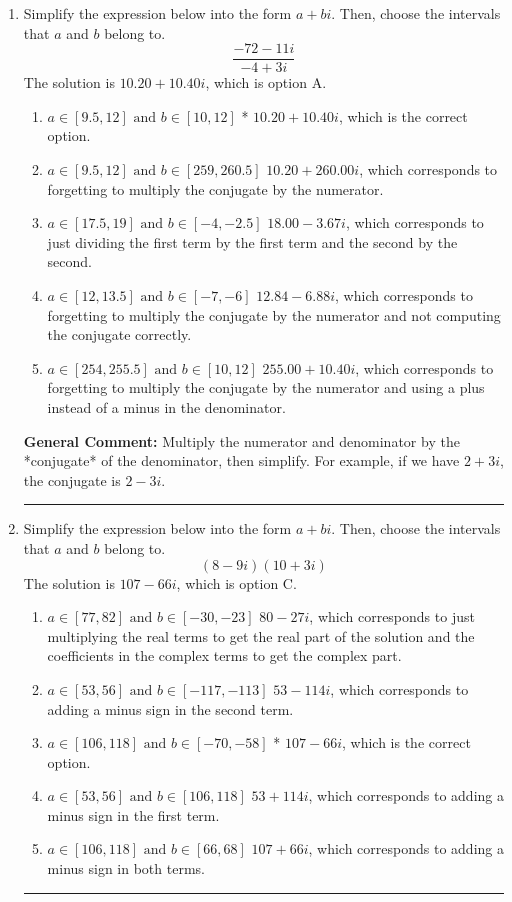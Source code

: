 \documentclass{extbook}[14pt]
\newcommand{\litem}[1]{\item #1

\rule{\textwidth}{0.4pt}}
\begin{document}
\begin{enumerate}\litem{
Simplify the expression below into the form $a+bi$. Then, choose the intervals that $a$ and $b$ belong to.
\[ \frac{-72 - 11 i}{-4 + 3 i} \]
The solution is \( 10.20  + 10.40 i \), which is option A.\begin{enumerate}[label=\Alph*.]
\item \( a \in [9.5, 12] \text{ and } b \in [10, 12] \)
* $10.20  + 10.40 i$, which is the correct option.
\item \( a \in [9.5, 12] \text{ and } b \in [259, 260.5] \)
 $10.20  + 260.00 i$, which corresponds to forgetting to multiply the conjugate by the numerator.
\item \( a \in [17.5, 19] \text{ and } b \in [-4, -2.5] \)
 $18.00  - 3.67 i$, which corresponds to just dividing the first term by the first term and the second by the second.
\item \( a \in [12, 13.5] \text{ and } b \in [-7, -6] \)
 $12.84  - 6.88 i$, which corresponds to forgetting to multiply the conjugate by the numerator and not computing the conjugate correctly.
\item \( a \in [254, 255.5] \text{ and } b \in [10, 12] \)
 $255.00  + 10.40 i$, which corresponds to forgetting to multiply the conjugate by the numerator and using a plus instead of a minus in the denominator.
\end{enumerate}

\textbf{General Comment:} Multiply the numerator and denominator by the *conjugate* of the denominator, then simplify. For example, if we have $2+3i$, the conjugate is $2-3i$.
}
\litem{
Simplify the expression below into the form $a+bi$. Then, choose the intervals that $a$ and $b$ belong to.
\[ (8 - 9 i)(10 + 3 i) \]
The solution is \( 107 - 66 i \), which is option C.\begin{enumerate}[label=\Alph*.]
\item \( a \in [77, 82] \text{ and } b \in [-30, -23] \)
 $80 - 27 i$, which corresponds to just multiplying the real terms to get the real part of the solution and the coefficients in the complex terms to get the complex part.
\item \( a \in [53, 56] \text{ and } b \in [-117, -113] \)
 $53 - 114 i$, which corresponds to adding a minus sign in the second term.
\item \( a \in [106, 118] \text{ and } b \in [-70, -58] \)
* $107 - 66 i$, which is the correct option.
\item \( a \in [53, 56] \text{ and } b \in [106, 118] \)
 $53 + 114 i$, which corresponds to adding a minus sign in the first term.
\item \( a \in [106, 118] \text{ and } b \in [66, 68] \)
 $107 + 66 i$, which corresponds to adding a minus sign in both terms.
\end{enumerate}

}
\end{enumerate}
\end{document}
